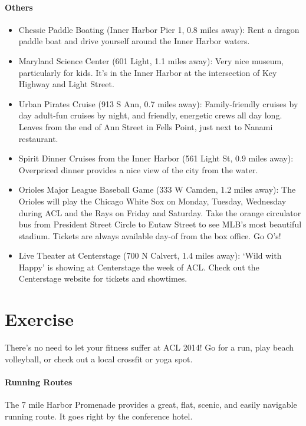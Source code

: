 \paragraph*{Others}
\begin{itemize}
\item{Chessie Paddle Boating (Inner Harbor Pier 1, 0.8 miles away): Rent a dragon paddle boat and drive yourself around the Inner Harbor waters.}
\item{Maryland Science Center (601 Light, 1.1 miles away): Very nice museum, particularly for kids. It's in the Inner Harbor at the intersection of Key Highway and Light Street.}
\item{Urban Pirates Cruise (913 S Ann, 0.7 miles away): Family-friendly cruises by day adult-fun cruises by night, and friendly, energetic crews all day long. Leaves from the end of Ann Street in Fells Point, just next to Nanami restaurant.}
\item{Spirit Dinner Cruises from the Inner Harbor (561 Light St, 0.9 miles away): Overpriced dinner provides a nice view of the city from the water.}
\item{Orioles Major League Baseball Game (333 W Camden, 1.2 miles away): The Orioles will play the Chicago White Sox on Monday, Tuesday, Wednesday during ACL and the Rays on Friday and Saturday. Take the orange circulator bus from President Street Circle to Eutaw Street to see MLB's most beautiful stadium. Tickets are always available day-of from the box office. Go O's!}
\item{Live Theater at Centerstage (700 N Calvert, 1.4 miles away): ‘Wild with Happy' is showing at Centerstage the week of ACL. Check out the Centerstage website for tickets and showtimes.}
\end{itemize}

\section{Exercise}
There's no need to let your fitness suffer at ACL 2014! Go for a run, play beach volleyball, or check out a local crossfit or yoga spot. 

\paragraph*{Running Routes}
The 7 mile Harbor Promenade provides a great, flat, scenic, and easily navigable running route. It goes right by the conference hotel. 

